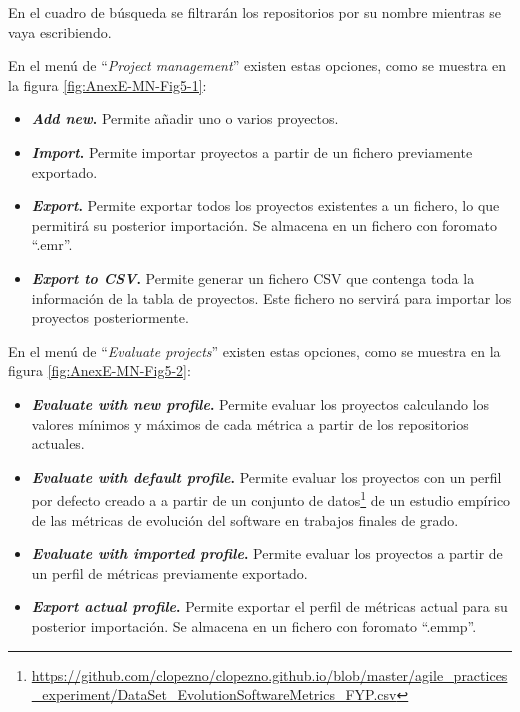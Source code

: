 En el cuadro de búsqueda se filtrarán los repositorios por su nombre mientras se vaya escribiendo.

En el menú de ``\textit{Project management}'' existen estas opciones, como se muestra en la figura \ref{fig:AnexE-MN-Fig5-1}:
\begin{itemize}
	\item \textbf{\textit{Add new}.} Permite añadir uno o varios proyectos.
	\item \textbf{\textit{Import}.} Permite importar proyectos a partir de un fichero previamente exportado.
	\item \textbf{\textit{Export}.} Permite exportar todos los proyectos existentes a un fichero, lo que permitirá su posterior importación. Se almacena en un fichero con foromato ``.emr''.
	\item \textbf{\textit{Export to CSV}.} Permite generar un fichero CSV que contenga toda la información de la tabla de proyectos. Este fichero no servirá para importar los proyectos posteriormente.
\end{itemize}
En el menú de ``\textit{Evaluate projects}'' existen estas opciones, como se muestra en la figura \ref{fig:AnexE-MN-Fig5-2}:
\begin{itemize}
	\item \textbf{\textit{Evaluate with new profile}.} Permite evaluar los proyectos calculando los valores mínimos y máximos de cada métrica a partir de los repositorios actuales.
	\item \textbf{\textit{Evaluate with default profile}.} Permite evaluar los proyectos con un perfil por defecto creado a a partir de un conjunto de datos\footnote{\url{https://github.com/clopezno/clopezno.github.io/blob/master/agile_practices_experiment/DataSet_EvolutionSoftwareMetrics_FYP.csv}} de un estudio empírico de las métricas de evolución del software en trabajos finales de grado\cite{lopez_portal_2019}.
	\item \textbf{\textit{Evaluate with imported profile}.} Permite evaluar los proyectos a partir de un perfil de métricas previamente exportado.
	\item \textbf{\textit{Export actual profile}.} Permite exportar el perfil de métricas actual para su posterior importación. Se almacena en un fichero con foromato ``.emmp''.
\end{itemize}

